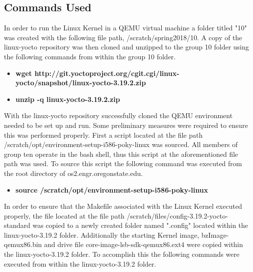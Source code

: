 \documentclass[10pt,onecolumn,draftclsnofoot]{IEEEtran} %
\begin{document}
\newpage
\begin{singlespace}
\section{\bf  Commands Used}

  \normalfont \indent In order to run the Linux Kernel in a QEMU virtual machine a folder titled "10" was created with the following file path, /scratch/spring2018/10. A copy of the linux-yocto repository was then cloned and unzipped to the group 10 folder using the following commands from within the group 10 folder.
\hfill\break

  \begin{itemize}
    \item \textbf{wget http://git.yoctoproject.org/cgit.cgi/linux-yocto/snapshot/linux-yocto-3.19.2.zip }
    \item \textbf{unzip -q linux-yocto-3.19.2.zip}
  \end{itemize}
\hfill\break

  \normalfont \indent With the linux-yocto repository successfully cloned the QEMU environment needed to be set up and run. Some preliminary measures were required to ensure this was performed properly. First a script located at the file path /scratch/opt/environment-setup-i586-poky-linux was sourced. All members of group ten operate in the bash shell, thus this script at the aforementioned file path was used. To source this script the following command was executed from the root directory of os2.engr.oregonstate.edu.

\hfill\break
  \begin{itemize}
    \item \textbf{source /scratch/opt/environment-setup-i586-poky-linux}
  \end{itemize}
\hfill\break
  \normalfont \indent In order to ensure that the Makefile associated with the Linux Kernel executed properly, the file located at the file path /scratch/files/config-3.19.2-yocto-standard was copied to a newly created folder named ".config" located within the linux-yocto-3.19.2 folder. Additionally the starting Kernel image, bzImage-qemux86.bin and drive file core-image-lsb-sdk-qemux86.ext4 were copied within the linux-yocto-3.19.2 folder. To accomplish this the following commands were executed from within the linux-yocto-3.19.2 folder.


\end{singlespace}
\end{document}

